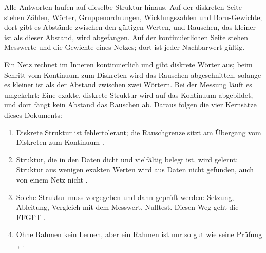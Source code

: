 Alle Antworten laufen auf dieselbe Struktur hinaus. Auf der diskreten Seite stehen Zählen, Wörter,
Gruppenordnungen, Wicklungszahlen und Born-Gewichte; dort gibt es Abstände zwischen den gültigen
Werten, und Rauschen, das kleiner ist als dieser Abstand, wird abgefangen. Auf der kontinuierlichen
Seite stehen Messwerte und die Gewichte eines Netzes; dort ist jeder Nachbarwert gültig.

\begin{center}
\end{center}

\noindent Ein Netz rechnet im Inneren kontinuierlich und gibt diskrete Wörter aus; beim Schritt vom
Kontinuum zum Diskreten wird das Rauschen abgeschnitten, solange es kleiner ist als der Abstand
zwischen zwei Wörtern. Bei der Messung läuft es umgekehrt: Eine exakte, diskrete Struktur wird auf das
Kontinuum abgebildet, und dort fängt kein Abstand das Rauschen ab. Daraus folgen die vier Kernsätze
dieses Dokuments:

\begin{enumerate}
\item Diskrete Struktur ist fehlertolerant; die Rauschgrenze sitzt am Übergang vom Diskreten zum
  Kontinuum \BM.
\item Struktur, die in den Daten dicht und vielfältig belegt ist, wird gelernt; Struktur aus wenigen
  exakten Werten wird aus Daten nicht gefunden, auch von einem Netz nicht \KM.
\item Solche Struktur muss vorgegeben und dann geprüft werden: Setzung, Ableitung, Vergleich mit dem
  Messwert, Nulltest. Diesen Weg geht die FFGFT \SM.
\item Ohne Rahmen kein Lernen, aber ein Rahmen ist nur so gut wie seine Prüfung \QM\,\cite{Wolpert1996}, \KM.
\end{enumerate}

